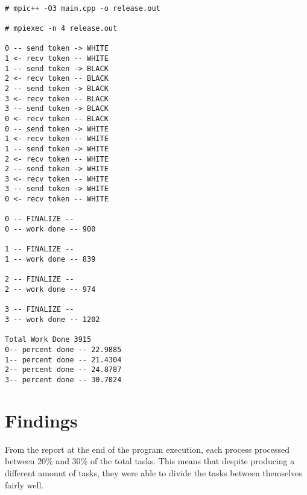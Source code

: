 \documentclass{article}
\begin{document}
\begin{lstlisting}[showstringspaces=false]

# mpic++ -O3 main.cpp -o release.out

# mpiexec -n 4 release.out

0 -- send token -> WHITE
1 <- recv token -- WHITE
1 -- send token -> BLACK
2 <- recv token -- BLACK
2 -- send token -> BLACK
3 <- recv token -- BLACK
3 -- send token -> BLACK
0 <- recv token -- BLACK
0 -- send token -> WHITE
1 <- recv token -- WHITE
1 -- send token -> WHITE
2 <- recv token -- WHITE
2 -- send token -> WHITE
3 <- recv token -- WHITE
3 -- send token -> WHITE
0 <- recv token -- WHITE

0 -- FINALIZE -- 
0 -- work done -- 900

1 -- FINALIZE -- 
1 -- work done -- 839

2 -- FINALIZE -- 
2 -- work done -- 974

3 -- FINALIZE -- 
3 -- work done -- 1202

Total Work Done 3915
0-- percent done -- 22.9885
1-- percent done -- 21.4304
2-- percent done -- 24.8787
3-- percent done -- 30.7024

\end{lstlisting}

\section*{Findings} 
From the report at the end of the program execution, each process processed between 20\% and 30\% of the total tasks. This means that despite producing a different amount of tasks, they were able to divide the tasks between themselves fairly well. 
\end{document}
